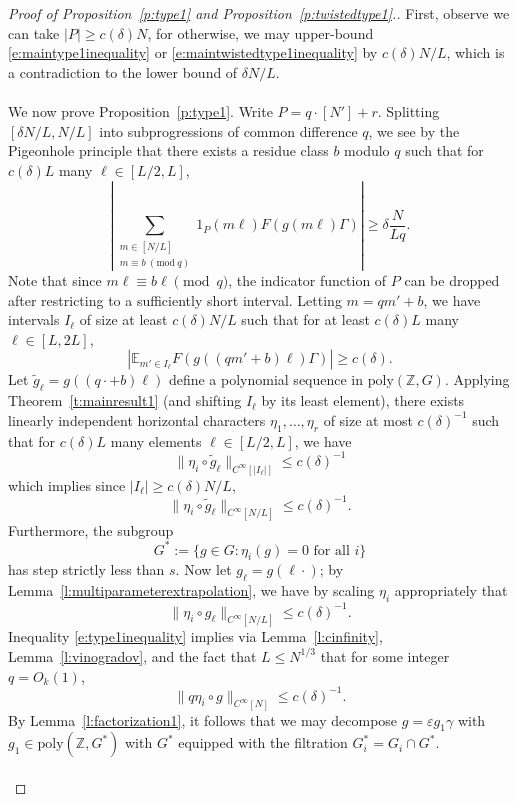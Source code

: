 \documentclass[11pt, a4paper]{amsart}
\newcommand{\nmod}[1]{~(\mathrm{mod}~#1)}
\theoremstyle{plain}
\theoremstyle{plain}
\theoremstyle{definition}
\theoremstyle{remark}
\numberwithin{equation}{section}
\numberwithin{lemma}{section}
\numberwithin{proposition}{section}
\numberwithin{corollary}{section}
\numberwithin{definition}{section}
\numberwithin{claim}{section}
\begin{document}
\begin{proof}[Proof of Proposition~\ref{p:type1} and Proposition~\ref{p:twistedtype1}.]
First, observe we can take $|P| \ge c(\delta)N$, for otherwise, we may upper-bound \eqref{e:maintype1inequality} or \eqref{e:maintwistedtype1inequality} by $c(\delta)N/L$, which is a contradiction to the lower bound of $\delta N/L$.  \\\\
We now prove Proposition~\ref{p:type1}. Write $P = q \cdot [N'] + r$. Splitting $[\delta N/L, N/L]$ into subprogressions of common difference $q$, we see by the Pigeonhole principle that there exists a residue class $b$ modulo $q$ such that for $c(\delta)L$ many $\ell \in [L/2, L]$, 
$$\left|\sum_{\substack{m \in [N/L] \\ m \equiv b \nmod{q}}} 1_P(m\ell)F(g(m\ell)\Gamma)\right| \ge \delta \frac{N}{Lq}.$$
Note that since $m\ell \equiv b\ell \pmod{q}$, the indicator function of $P$ can be dropped after restricting to a sufficiently short interval. Letting $m = qm' + b$, we have intervals $I_{\ell}$ of size at least $c(\delta)N/L$ such that for at least $c(\delta)L$ many $\ell \in [L, 2L]$,
$$\left|\mathbb{E}_{m' \in I_\ell} F(g((qm' + b)\ell)\Gamma)\right| \ge c(\delta).$$
Let $\tilde{g}_\ell = g((q\cdot + b)\ell)$ define a polynomial sequence in $\mathrm{poly}(\mathbb{Z}, G)$. Applying Theorem~\ref{t:mainresult1} (and shifting $I_\ell$ by its least element), there exists linearly independent horizontal characters $\eta_1, \dots, \eta_r$ of size at most $c(\delta)^{-1}$ such that for $c(\delta)L$ many elements $\ell \in [L/2, L]$, we have
$$\|\eta_i \circ \tilde{g}_\ell\|_{C^\infty[|I_\ell|]} \le c(\delta)^{-1}$$
which implies since $|I_\ell| \ge c(\delta)N/L$,
$$\|\eta_i \circ \tilde{g}_\ell\|_{C^\infty[N/L]} \le c(\delta)^{-1}.$$ 
Furthermore, the subgroup
$$G^* := \{g \in G: \eta_i(g) = 0 \text{ for all } i\}$$
has step strictly less than $s$. Now let $g_\ell = g(\ell \cdot)$; by Lemma~\ref{l:multiparameterextrapolation}, we have by scaling $\eta_i$ appropriately that
\begin{equation}\label{e:type1inequality}
\|\eta_i \circ g_\ell\|_{C^\infty[N/L]} \le c(\delta)^{-1}.
\end{equation}
Inequality \eqref{e:type1inequality} implies via Lemma~\ref{l:cinfinity}, Lemma~\ref{l:vinogradov}, and the fact that $L \le N^{1/3}$ that for some integer $q = O_k(1)$,
$$\|q\eta_i \circ g\|_{C^\infty[N]} \le c(\delta)^{-1}.$$
By Lemma~\ref{l:factorization1}, it follows that we may decompose $g = \varepsilon g_1\gamma$ with $g_1 \in \mathrm{poly}(\mathbb{Z}, G^*)$ with $G^*$ equipped with the filtration $G^*_i = G_i \cap G^*$. \\\\

\end{proof}
\end{document}
